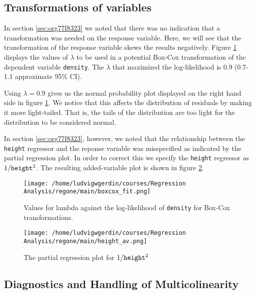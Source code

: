 \documentclass[11pt]{article}
\begin{document}


\subsection{Transformations of variables}
\label{sec:org02a8923}

In section \ref{sec:org77f8323} we noted that there was no indication that a transformation was needed on the 
response variable. Here, we will see that the transformation of the response variable skews the results negatively.
Figure \ref{fig:orgb2f9ad5} displays the values of \(\lambda\) to be used in a potential Box-Cox transformation of 
the dependent variable \texttt{density}. The \(\lambda\) that maximized the log-likelihood is 0.9 
(0.7-1.1 approximate 95\% CI). 

Using \(\lambda = 0.9\) gives us the normal probability plot displayed on the right hand side in figure
\ref{fig:orgb2f9ad5}. We notice that this affects the distribution of residuals by making it more light-tailed. 
That is, the tails of the distribution are too light for the distribution to be considered normal.

In section \ref{sec:org77f8323}, however, we noted that the relationship between the \texttt{height} regressor 
and the reponse variable was misspecified as indicated by the partial regression plot. In order to correct 
this we specify the \texttt{height} regressor as \(1/\text{\texttt{height}}^2\). The resulting added-variable
plot is shown in figure \ref{fig:org62ef8cc}.

\begin{figure}[h]
\centering
\texttt{[image: /home/ludvigwgerdin/courses/Regression Analysis/regone/main/boxcox\_fit.png]}
\caption{\label{fig:orgb2f9ad5}
Values for lambda against the log-likelihood of \texttt{density} for Box-Cox transformations.}
\end{figure}

\begin{figure}[h]
\centering
\texttt{[image: /home/ludvigwgerdin/courses/Regression Analysis/regone/main/height\_av.png]}
\caption{\label{fig:org62ef8cc}
The partial regression plot for \(1/\text{\texttt{height}}^2\)}
\end{figure}

\subsection{Diagnostics and Handling of Multicolinearity}
\label{sec:org01ee4af}
\end{document}

